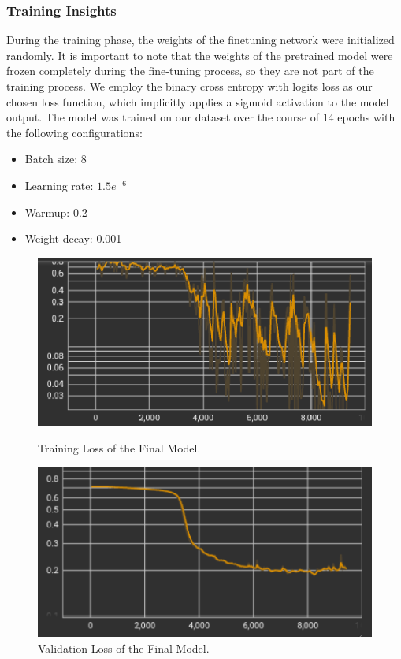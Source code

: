 \documentclass[a4paper,10pt]{report} %
\begin{document}
\subsubsection{Training Insights}
During the training phase, the weights of the finetuning network were initialized randomly. It is important to note that the weights of the pretrained model were frozen completely during the fine-tuning process, so they are not part of the training process. We employ the binary cross entropy with logits loss as our chosen loss function, which implicitly applies a sigmoid activation to the model output. The model was trained on our dataset over the course of 14 epochs with the following configurations: 
\begin{itemize}
  \item Batch size: 8
  \item Learning rate: $1.5e^{-6}$
  \item Warmup: 0.2
  \item Weight decay: 0.001
\end{itemize}
\begin{figure}[h]
  \begin{minipage}[b]{0.49\textwidth}
    \centering
    \includegraphics[width=\textwidth]{img/final_model_train_loss.png}
    \caption{Training Loss of the Final Model.}
    \label{fig:final_train_loss}
  \end{minipage}
  \hfill
  \begin{minipage}[b]{0.49\textwidth}
    \centering
    \includegraphics[width=\textwidth]{img/final_model_val_loss.png}
    \caption{Validation Loss of the Final Model.}
    \label{fig:final_valid_loss}
  \end{minipage}
\end{figure}
\end{document}
